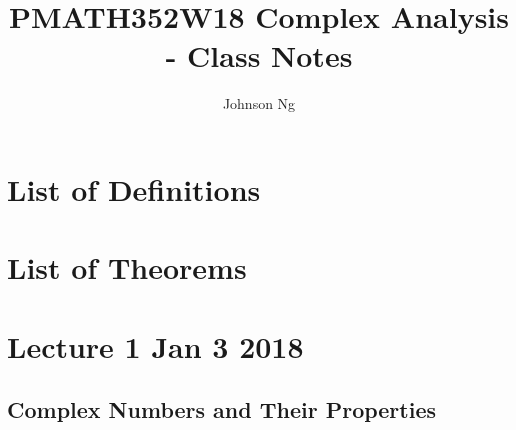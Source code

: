 \documentclass[11pt, oneside]{book}
\title{PMATH352W18 Complex Analysis - Class Notes}
\author{Johnson Ng}
\begin{document}
\hypersetup{pageanchor=false}
\maketitle
\hypersetup{pageanchor=true}
\tableofcontents

\chapter*{List of Definitions}

\chapter*{List of Theorems}

\chapter{Lecture 1 Jan 3 2018}
	\label{chapter:lecture_1_jan_3_2018}

\section{Complex Numbers and Their Properties} %
\label{sec:complex_numbers_and_their_properties}
\end{document}
